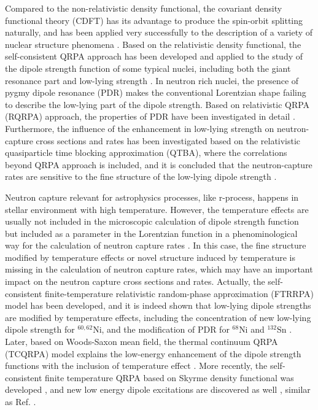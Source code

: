 \documentclass[aps,preprint,showpacs,superscriptaddress,floatfix]{revtex4-1} %
\begin{document}
Compared to the non-relativistic density functional, the covariant density functional theory (CDFT) has its advantage to produce the spin-orbit splitting naturally, and has been applied very successfully to the description of a variety of nuclear structure phenomena \cite{Placeholder:09}. Based on the relativistic density functional, the self-consistent QRPA approach has been developed and applied to the study of the dipole strength function of some typical nuclei, including both the giant resonance part and low-lying strength \cite{Paar2003}. In neutron rich nuclei, the presence of pygmy dipole resonance (PDR) \cite{Paar2007} makes the conventional Lorentzian shape failing to describe the low-lying part of the dipole strength. Based on relativistic QRPA (RQRPA) approach, the properties of PDR have been investigated in detail \cite{Niu, Vretenar}. Furthermore, the influence of the enhancement in low-lying strength on neutron-capture cross sections and rates has been investigated based on the relativistic quasiparticle time blocking approximation (QTBA), where the correlations beyond QRPA approach is included, and it is concluded that the neutron-capture rates are sensitive to the fine structure of the low-lying dipole strength \cite{Litvinova_2009}.

Neutron capture relevant for astrophysics processes, like r-process, happens in stellar environment with high temperature. However, the temperature effects are usually not included in the microscopic calculation of dipole strength function but included as a parameter in the Lorentzian function in a phenominological way for the calculation of neutron capture rates \cite{GorielyNPA2002, GorielyPLB1998, Goriely2019}. In this case, the fine structure modified by temperature effects or novel structure induced by temperature is missing in the calculation of neutron capture rates, which may have an important impact on the neutron capture cross sections and rates. Actually, the self-consistent finite-temperature relativistic random-phase approximation (FTRRPA) model has been developed, and it is indeed shown that low-lying dipole strengths are modified by temperature effects, including the concentration of new low-lying dipole strength for $^{60,62}$Ni, and the modification of PDR for $^{68}$Ni and $^{132}$Sn \cite{Niu_2009}. Later, based on Woods-Saxon mean field, the thermal continuum QRPA (TCQRPA) model explains the low-energy enhancement of the dipole strength functions with the inclusion of temperature effect \cite{Litvinova2013}. More recently, the self-consistent finite temperature QRPA based on Skyrme density functional was developed \cite{Yuksel2017}, and new low energy dipole excitations are discovered as well \cite{Yuksel2017, Yuksel2019}, similar as Ref. \cite{Niu_2009, Litvinova2013}.
\end{document}
